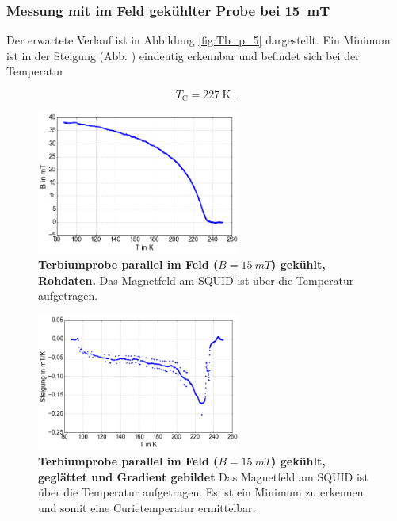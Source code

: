 \documentclass[a4paper,ngerman]{scrartcl}
\begin{document}
\subsubsection*{Messung mit im Feld gekühlter Probe bei \SI{15}{mT}}

Der erwartete Verlauf ist in Abbildung \ref{fig:Tb_p_5} dargestellt.
Ein Minimum ist in der Steigung (Abb. ) eindeutig erkennbar und befindet sich bei der Temperatur

\begin{equation}
T_{\mathrm{C}} = \SI{227}{\K} ~.
\end{equation}

\begin{figure}
\centering
\includegraphics[width=0.6\textwidth]{abbildungen/Tb_p_15.png}
\caption[Terbiumprobe parallel bei 15mT]{\textbf{Terbiumprobe parallel im Feld ($B = \SI{15}{mT}$) gekühlt, Rohdaten.} 
Das Magnetfeld am SQUID ist über die Temperatur aufgetragen. }
\label{fig:Tb_p_15}
\end{figure}

\begin{figure}
\centering
\includegraphics[width=0.6\textwidth]{abbildungen/Tb_p_15_grad.png}
\caption[Terbiumprobe parallel bei 15mT]{\textbf{Terbiumprobe parallel im Feld ($B = \SI{15}{mT}$) gekühlt, geglättet und Gradient gebildet} 
Das Magnetfeld am SQUID ist über die Temperatur aufgetragen. 
Es ist ein Minimum zu erkennen und somit eine Curietemperatur ermittelbar.}
\label{fig:Tb_p_15_grad}
\end{figure}
\end{document}

